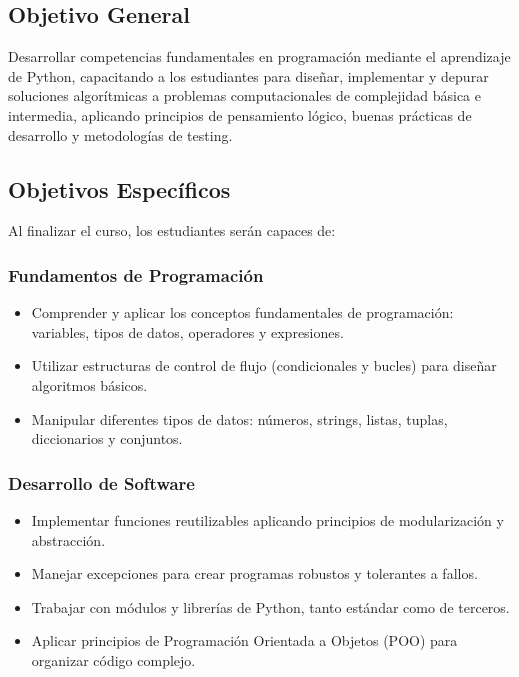 \documentclass[12pt,letterpaper]{article}
\begin{document}
\subsection{Objetivo General}

\begin{objetivobox}
Desarrollar competencias fundamentales en programación mediante el aprendizaje de Python, capacitando a los estudiantes para diseñar, implementar y depurar soluciones algorítmicas a problemas computacionales de complejidad básica e intermedia, aplicando principios de pensamiento lógico, buenas prácticas de desarrollo y metodologías de testing.
\end{objetivobox}

\subsection{Objetivos Específicos}

Al finalizar el curso, los estudiantes serán capaces de:

\subsubsection{Fundamentos de Programación}
\begin{itemize}[leftmargin=*]
    \item Comprender y aplicar los conceptos fundamentales de programación: variables, tipos de datos, operadores y expresiones.
    \item Utilizar estructuras de control de flujo (condicionales y bucles) para diseñar algoritmos básicos.
    \item Manipular diferentes tipos de datos: números, strings, listas, tuplas, diccionarios y conjuntos.
\end{itemize}

\subsubsection{Desarrollo de Software}
\begin{itemize}[leftmargin=*]
    \item Implementar funciones reutilizables aplicando principios de modularización y abstracción.
    \item Manejar excepciones para crear programas robustos y tolerantes a fallos.
    \item Trabajar con módulos y librerías de Python, tanto estándar como de terceros.
    \item Aplicar principios de Programación Orientada a Objetos (POO) para organizar código complejo.
\end{itemize}
\end{document}
